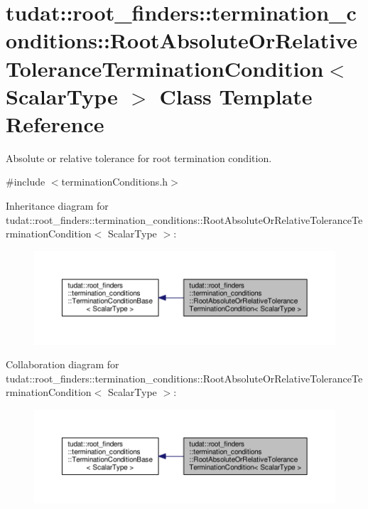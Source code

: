 \hypertarget{classtudat_1_1root__finders_1_1termination__conditions_1_1RootAbsoluteOrRelativeToleranceTerminationCondition}{}\section{tudat\+:\+:root\+\_\+finders\+:\+:termination\+\_\+conditions\+:\+:Root\+Absolute\+Or\+Relative\+Tolerance\+Termination\+Condition$<$ Scalar\+Type $>$ Class Template Reference}
\label{classtudat_1_1root__finders_1_1termination__conditions_1_1RootAbsoluteOrRelativeToleranceTerminationCondition}


Absolute or relative tolerance for root termination condition.  




{\ttfamily \#include $<$termination\+Conditions.\+h$>$}



Inheritance diagram for tudat\+:\+:root\+\_\+finders\+:\+:termination\+\_\+conditions\+:\+:Root\+Absolute\+Or\+Relative\+Tolerance\+Termination\+Condition$<$ Scalar\+Type $>$\+:
\nopagebreak
\begin{figure}[H]
\begin{center}
\leavevmode
\includegraphics[width=350pt]{classtudat_1_1root__finders_1_1termination__conditions_1_1RootAbsoluteOrRelativeToleranceTerminationCondition__inherit__graph}
\end{center}
\end{figure}


Collaboration diagram for tudat\+:\+:root\+\_\+finders\+:\+:termination\+\_\+conditions\+:\+:Root\+Absolute\+Or\+Relative\+Tolerance\+Termination\+Condition$<$ Scalar\+Type $>$\+:
\nopagebreak
\begin{figure}[H]
\begin{center}
\leavevmode
\includegraphics[width=350pt]{classtudat_1_1root__finders_1_1termination__conditions_1_1RootAbsoluteOrRelativeToleranceTerminationCondition__coll__graph}
\end{center}
\end{figure}
